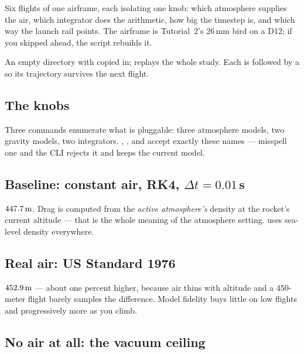 Six flights of one airframe, each isolating one knob: which atmosphere
supplies the air, which integrator does the arithmetic, how big the timestep
is, and which way the launch rail points. The airframe is Tutorial~2's 26\,mm
bird on a D12; if you skipped ahead, the script rebuilds it.

\begin{note}[Setup]
An empty directory with  copied in;
 replays the whole study. Each  is
followed by a  so its trajectory survives the next flight.
\end{note}

\subsection*{The knobs}



Three  commands enumerate what is pluggable: three atmosphere
models, two gravity models, two integrators. ,
, and  accept exactly these names ---
misspell one and the CLI rejects it and keeps the current model.

\subsection*{Baseline: constant air, RK4, $\Delta t = 0.01$\,s}



$447.7\,\mathrm{m}$. Drag is computed from the \emph{active atmosphere's} density at the
rocket's current altitude --- that is the whole meaning of the atmosphere
setting.  uses sea-level density everywhere.

\subsection*{Real air: US Standard 1976}



$452.9\,\mathrm{m}$ --- about one percent higher, because air thins with altitude and a
450-meter flight barely samples the difference. Model fidelity buys little on
low flights and progressively more as you climb.

\subsection*{No air at all: the vacuum ceiling}

